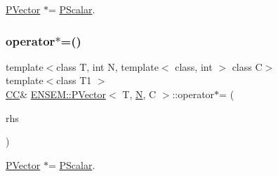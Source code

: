 \mbox{\hyperlink{classENSEM_1_1PVector}{P\+Vector}} $\ast$= \mbox{\hyperlink{classENSEM_1_1PScalar}{P\+Scalar}}. 

\mbox{\label{classENSEM_1_1PVector_af17add91449d0507d1a0361ba1a3cc64}} 
\subsubsection{\texorpdfstring{operator$\ast$=()}{operator*=()}\hspace{0.1cm}{\footnotesize\ttfamily [3/3]}}
{\footnotesize\ttfamily template$<$class T, int N, template$<$ class, int $>$ class C$>$ \\
template$<$class T1 $>$ \\
\mbox{\hyperlink{classENSEM_1_1PVector_a92dc0a0a301a3dc96f7be5d337019bc7}{CC}}\& \mbox{\hyperlink{classENSEM_1_1PVector}{E\+N\+S\+E\+M\+::\+P\+Vector}}$<$ T, \mbox{\hyperlink{adat__devel_2lib_2hadron_2operator__name__util_8cc_a7722c8ecbb62d99aee7ce68b1752f337}{N}}, C $>$\+::operator$\ast$= (\begin{DoxyParamCaption}\item[{const \mbox{\hyperlink{classENSEM_1_1PScalar}{P\+Scalar}}$<$ T1 $>$ \&}]{rhs }\end{DoxyParamCaption})\hspace{0.3cm}{\ttfamily [inline]}}



\mbox{\hyperlink{classENSEM_1_1PVector}{P\+Vector}} $\ast$= \mbox{\hyperlink{classENSEM_1_1PScalar}{P\+Scalar}}. 

\mbox{\label{classENSEM_1_1PVector_a39e015a8751290105c2960d1607c1ce8}} 
